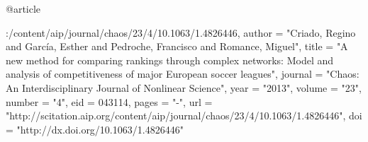 ﻿@article{:/content/aip/journal/chaos/23/4/10.1063/1.4826446,
   author = "Criado, Regino and García, Esther and Pedroche, Francisco and Romance, Miguel",
   title = "A new method for comparing rankings through complex networks: Model and analysis of competitiveness of major European soccer leagues",
   journal = "Chaos: An Interdisciplinary Journal of Nonlinear Science",
   year = "2013",
   volume = "23",
   number = "4", 
   eid = 043114,
   pages = "-",
   url = "http://scitation.aip.org/content/aip/journal/chaos/23/4/10.1063/1.4826446",
   doi = "http://dx.doi.org/10.1063/1.4826446" 

}
